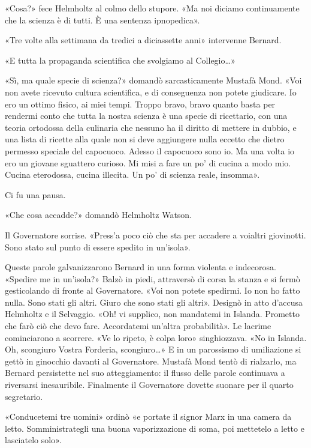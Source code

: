 \documentclass[
a5paper, %
10pt, %
twoside, 
onecolumn, %
openany, %
]{memoir}
\begin{document}
«Cosa?» fece Helmholtz al colmo dello stupore. «Ma noi diciamo continuamente che la scienza è di tutti. È una sentenza ipnopedica».

«Tre volte alla settimana da tredici a diciassette anni» intervenne Bernard.

«E tutta la propaganda scientifica che svolgiamo al Collegio…»

«Sì, ma quale specie di scienza?» domandò sarcasticamente Mustafà Mond. «Voi non avete ricevuto cultura scientifica, e di conseguenza non potete giudicare. Io ero un ottimo fisico, ai miei tempi. Troppo bravo, bravo quanto basta per rendermi conto che tutta la nostra scienza è una specie di ricettario, con una teoria ortodossa della culinaria che nessuno ha il diritto di mettere in dubbio, e una lista di ricette alla quale non si deve aggiungere nulla eccetto che dietro permesso speciale del capocuoco. Adesso il capocuoco sono io. Ma una volta io ero un giovane sguattero curioso. Mi misi a fare un po’ di cucina a modo mio. Cucina eterodossa, cucina illecita. Un po’ di scienza reale, insomma».

Ci fu una pausa.

«Che cosa accadde?» domandò Helmholtz Watson.

Il Governatore sorrise. «Press’a poco ciò che sta per accadere a voialtri giovinotti. Sono stato sul punto di essere spedito in un’isola».

Queste parole galvanizzarono Bernard in una forma violenta e indecorosa. «Spedire me in un’isola?» Balzò in piedi, attraversò di corsa la stanza e si fermò gesticolando di fronte al Governatore. «Voi non potete spedirmi. Io non ho fatto nulla. Sono stati gli altri. Giuro che sono stati gli altri». Designò in atto d’accusa Helmholtz e il Selvaggio. «Oh! vi supplico, non mandatemi in Islanda. Prometto che farò ciò che devo fare. Accordatemi un’altra probabilità». Le lacrime cominciarono a scorrere. «Ve lo ripeto, è colpa loro» singhiozzava. «No in Islanda. Oh, scongiuro Vostra Forderia, scongiuro…» E in un parossismo di umiliazione si gettò in ginocchio davanti al Governatore. Mustafà Mond tentò di rialzarlo, ma Bernard persistette nel suo atteggiamento: il flusso delle parole continuava a riversarsi inesauribile. Finalmente il Governatore dovette suonare per il quarto segretario.

«Conducetemi tre uomini» ordinò «e portate il signor Marx in una camera da letto. Somministrategli una buona vaporizzazione di soma, poi mettetelo a letto e lasciatelo solo».
\end{document}

